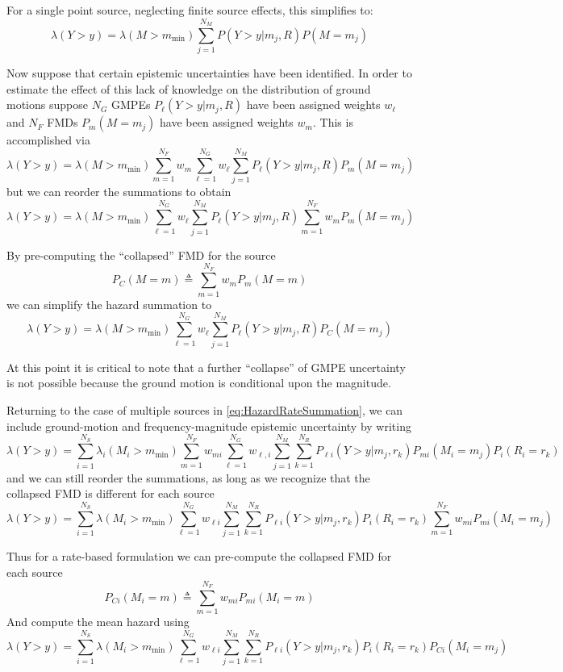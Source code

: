 \documentclass{article}
\begin{document}
For a single point source, neglecting finite source effects, this simplifies to:
$$ 
\lambda(Y > y) = 
\lambda(M > m_\text{min}) 
\sum_{j=1}^{N_M} 
P(Y > y|m_j,R) 
P(M=m_j) 
$$

Now suppose that certain epistemic uncertainties have been identified. 
In order to estimate the effect of this lack of knowledge on the distribution of ground motions suppose $N_G$ GMPEs $P_\ell(Y > y|m_j,R)$ have been assigned weights $w_\ell$ and $N_F$ FMDs $P_m(M=m_j)$ have been assigned weights $w_m$. 
This is accomplished via
$$ 
\lambda(Y > y) = 
\lambda(M > m_\text{min}) 
\sum_{m=1}^{N_F} w_m 
\sum_{\ell=1}^{N_G} w_\ell 
\sum_{j=1}^{N_M} 
P_\ell(Y > y|m_j,R) 
P_m(M=m_j) 
$$
but we can reorder the summations to obtain
$$ 
\lambda(Y > y) = 
\lambda(M > m_\text{min}) 
\sum_{\ell=1}^{N_G} w_\ell 
\sum_{j=1}^{N_M} 
P_\ell(Y > y|m_j,R) 
\sum_{m=1}^{N_F} w_m 
P_m(M=m_j) 
$$

By pre-computing the ``collapsed'' FMD for the source
$$ 
P_C(M=m) \triangleq 
\sum_{m=1}^{N_F} w_m P_m(M=m) 
$$
we can simplify the hazard summation to
$$ 
\lambda(Y > y) = 
\lambda(M > m_\text{min}) 
\sum_{\ell=1}^{N_G} w_\ell 
\sum_{j=1}^{N_M} 
P_\ell(Y > y|m_j,R) 
P_C(M=m_j) 
$$

At this point it is critical to note that a further ``collapse'' of GMPE uncertainty is not possible because the ground motion is conditional upon the magnitude.

Returning to the case of multiple sources in \eqref{eq:HazardRateSummation}, we can include ground-motion and frequency-magnitude epistemic uncertainty by writing
$$ \lambda(Y > y) = 
\sum_{i=1}^{N_S} 
\lambda_i(M_i > m_\text{min}) 
\sum_{m=1}^{N_F} w_{mi} 
\sum_{\ell=1}^{N_G} w_{\ell,i}
\sum_{j=1}^{N_M} 
\sum_{k=1}^{N_R} 
P_{\ell i}(Y > y|m_j,r_k) 
P_{mi}(M_i=m_j) 
P_i(R_i=r_k) $$
and we can still reorder the summations, as long as we recognize that the collapsed FMD is different for each source
$$
\lambda(Y > y) = 
\sum_{i=1}^{N_S} 
\lambda(M_i > m_\text{min}) 
\sum_{\ell=1}^{N_G} w_{\ell i}
\sum_{j=1}^{N_M} 
\sum_{k=1}^{N_R} 
P_{\ell i}(Y > y|m_j,r_k) 
P_i(R_i=r_k) 
\sum_{m=1}^{N_F} w_{mi} 
P_{mi}(M_i=m_j) 
$$

Thus for a rate-based formulation we can pre-compute the collapsed FMD for each source
\begin{equation} \label{eq:CollapsedFmd} 
P_{Ci}(M_i = m) \triangleq
\sum_{m=1}^{N_F} w_{mi} 
P_{mi}(M_i=m) 
\end{equation}
And compute the mean hazard using
\begin{equation} \label{eq:RateHazardCollapsed} 
\lambda(Y > y) = 
\sum_{i=1}^{N_S} 
\lambda(M_i > m_\text{min}) 
\sum_{\ell=1}^{N_G} w_{\ell i}
\sum_{j=1}^{N_M} 
\sum_{k=1}^{N_R} 
P_{\ell i}(Y > y|m_j,r_k) 
P_i(R_i=r_k) 
P_{Ci}(M_i = m_j) 
\end{equation}
\end{document}
